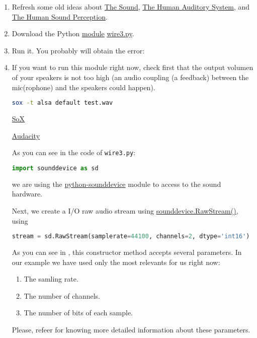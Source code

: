 \begin{enumerate}

\item Refresh some old ideas about
  \href{https://vicente-gonzalez-ruiz.github.io/the_sound/}{The
    Sound},
  \href{https://vicente-gonzalez-ruiz.github.io/human_auditory_system/}{The
    Human Auditory System}, and
  \href{https://vicente-gonzalez-ruiz.github.io/human_sound_perception/}{The
    Human Sound Perception}.
  
\item Download the Python
  \href{https://docs.python.org/3/tutorial/modules.html}{module}
  \href{https://raw.githubusercontent.com/Tecnologias-multimedia/intercom/master/test/sounddevice/wire3.py}{wire3.py}.

\item Run it. You probably will obtain the error:

\item If you want to run this module right now, check first that the
  output volumen of your speakers is not too high (an audio coupling
  (a feedback) between the mic(rophone) and the speakers could
  happen).

\begin{lstlisting}[language=Bash]
  sox -t alsa default test.wav
\end{lstlisting}

\href{http://sox.sourceforge.net/}{SoX}

\href{https://www.audacityteam.org/}{Audacity}

As you can see in the code of \texttt{wire3.py}:

\begin{lstlisting}[language=Python]
import sounddevice as sd
\end{lstlisting}

we are using the
\href{https://python-sounddevice.readthedocs.io/en/latest/}{python-sounddevice}
\cite{sounddevice} module to access to the sound hardware.

Next, we create a I/O raw audio stream
using \href{https://python-sounddevice.readthedocs.io/en/latest/api/raw-streams.html#sounddevice.RawStream}{sounddevice.RawStream()},
using
\begin{lstlisting}[language=Python]
stream = sd.RawStream(samplerate=44100, channels=2, dtype='int16')
\end{lstlisting}

As you can see in \cite{sounddevice}, this constructor method accepts
several parameters. In our example we have used only the most
relevants for us right now:
\begin{enumerate}
\item The samling rate.
\item The number of channels.
\item The number of bits of each sample.
\end{enumerate}
Please, refeer \cite{harmonic-analysis} for knowing more detailed
information about these parameters.


\end{enumerate}
